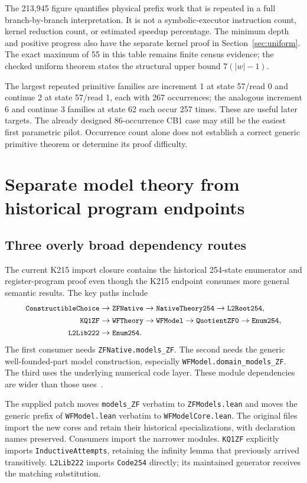 \documentclass[11pt,letterpaper]{article}
\newcommand{\code}[1]{\texttt{\small #1}}
\begin{document}
The 213,945 figure quantifies physical prefix work that is repeated in a full
branch-by-branch interpretation. It is not a symbolic-executor instruction count,
kernel reduction count, or estimated speedup percentage. The minimum depth and
positive progress also have the separate kernel proof in Section~\ref{sec:uniform}.
The exact maximum of 55 in this table remains finite census evidence; the checked
uniform theorem states the structural upper bound \(7(|w|-1)\).

The largest repeated primitive families are increment 1 at state 57/read 0 and
continue 2 at state 57/read 1, each with 267 occurrences; the analogous increment
6 and continue 3 families at state 62 each occur 257 times. These are useful later
targets. The already designed 86-occurrence CB1 case may still be the easiest first
parametric pilot. Occurrence count alone does not establish a correct generic
primitive theorem or determine its proof difficulty.

\section{Separate model theory from historical program endpoints}
\label{sec:imports}

\subsection{Three overly broad dependency routes}

The current K215 import closure contains the historical 254-state enumerator and
register-program proof even though the K215 endpoint consumes more general semantic
results. The key paths include
\begin{align*}
\code{ConstructibleChoice}&\to\code{ZFNative}\to\code{NativeTheory254}\to\code{L2Root254},\\
\code{KQ1ZF}&\to\code{WFTheory}\to\code{WFModel}\to\code{QuotientZF0}\to\code{Enum254},\\
\code{L2Lib222}&\to\code{Enum254}.
\end{align*}
The first consumer needs \code{ZFNative.models\_ZF}. The second needs the generic
well-founded-part model construction, especially \code{WFModel.domain\_models\_ZF}.
The third uses the underlying numerical code layer. These module dependencies are
wider than those uses~\cite{modelimports}.

The supplied patch moves \code{models\_ZF} verbatim to \code{ZFModels.lean} and moves
the generic prefix of \code{WFModel.lean} verbatim to \code{WFModelCore.lean}. The
original files import the new cores and retain their historical specializations,
with declaration names preserved. Consumers import the narrower modules.
\code{KQ1ZF} explicitly imports \code{InductiveAttempts}, retaining the infinity
lemma that previously arrived transitively. \code{L2Lib222} imports \code{Code254}
directly; its maintained generator receives the matching substitution.
\end{document}
